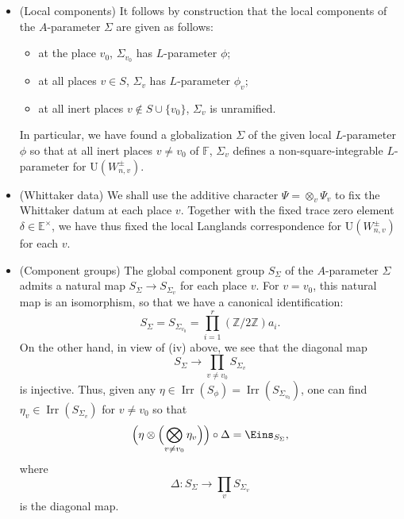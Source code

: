 \documentclass[11pt]{amsart}
\numberwithin{equation}{section}
\theoremstyle{plain}
\theoremstyle{definition}
\theoremstyle{remark}
\def\Irr{\operatorname{Irr}}
\def\U{\mathrm{U}}
\def\EE{\mathbb{E}}
\def\FF{\mathbb{F}}
\def\ZZ{\mathbb{Z}}
\def\1{\Eins}
\begin{document}
\begin{itemize}

\item (Local components)
It follows by construction that the local components of the $A$-parameter $\Sigma$ are given as follows:
\begin{itemize}
\item at the place $v_0$, $\Sigma_{v_0}$ has $L$-parameter $\phi$;
\item at all places $v \in S$, $\Sigma_v$ has $L$-parameter $\phi_v$;
\item at all inert places $v \notin S \cup \{ v_0 \}$, $\Sigma_v$ is unramified.
\end{itemize}
In particular, we have found a globalization $\Sigma$ of the given local $L$-parameter $\phi$ so that at all inert places $v \ne v_0$ of $\FF$, $\Sigma_v$ defines a non-square-integrable $L$-parameter for $\U(W_{n,v}^{\pm})$.

\item (Whittaker data)
We shall use the additive character $\Psi = \otimes_v \Psi_v$ to fix the Whittaker datum at each place $v$. Together with the fixed trace zero element $\delta \in \EE^{\times}$, we have thus fixed the local Langlands correspondence for $\U(W_{n,v}^{\pm})$ for each $v$. 

\item (Component groups)
The global component group $S_{\Sigma}$ of the $A$-parameter $\Sigma$ admits a natural map $S_{\Sigma} \rightarrow S_{\Sigma_v}$ for each place $v$. For $v = v_0$, this natural map is an isomorphism, so that we have a canonical identification:
\[  S_{\Sigma}  =  S_{\Sigma_{v_0}} =  \prod_{i=1}^r (\ZZ /2 \ZZ) a_i. \]
On the other hand, in view of (iv) above, we see that the diagonal map
\[   S_{\Sigma}  \longrightarrow \prod_{v \ne v_0}  S_{\Sigma_v} \]
is injective.
Thus, given any $\eta \in \Irr(S_{\phi}) = \Irr(S_{\Sigma_{v_0}})$, one can find $\eta_v \in \Irr(S_{\Sigma_v})$ for $v \ne v_0$ so that
\[  \Bigl( \eta \otimes \Bigl( \bigotimes_{v \ne v_0} \eta_v \Bigr) \Bigr) \circ \Delta =  \1_{S_{\Sigma}}, \]
where 
\[  \Delta:  S_{\Sigma} \longrightarrow \prod_v S_{\Sigma_v} \]
is the diagonal map.


\end{itemize}
\end{document}

